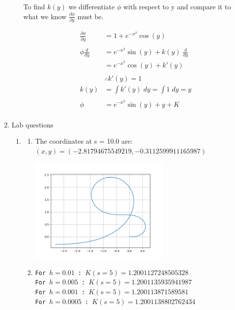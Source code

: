 \documentclass[a4paper,11pt]{article}
\begin{document}
\begin{preview}
\begin{enumerate}
\begin{enumerate}
    To find $k(y)$ we differentiate $\phi$ with respect to y and compare it to what we know $\frac{\partial \phi}{\partial y}$ must be.

    \begin{align*}
        \frac{\partial \phi}{\partial y} &= 1+e^{-x^2}\cos(y)\\\\
        \phi \frac{d}{dy} &= e^{-x^2}\sin(y) +k(y) \; \frac{d}{dy}\\
        &= e^{-x^2}\cos(y) +k'(y)\\\\
        &\therefore k'(y) = 1\\
        k(y) &= \int k'(y) \; dy = \int 1 \; dy = y\\\\
        \phi &= e^{-x^2}\sin(y) + y + K\\
    \end{align*}

\end{enumerate}

\item Lab questions

\begin{enumerate}
    \item
\begin{enumerate}
    \item The coordinates at s = 10.0 are: \\$(x,y) = (-2.81794675549219,-0.3112599911165987)$
    
    \begin{center}
        \includegraphics[width = 0.6\textwidth]{Figure_1.png}
    \end{center}

    \item 
    \texttt{For $h = 0.01$ : $K(s=5) = 1.2001127248505328$\\
            For $h = 0.005$ : $K(s=5) = 1.2001135935941987$\\
            For $h = 0.001$ : $K(s=5) = 1.200113871589581$\\
            For $h = 0.0005$ : $K(s=5) = 1.2001138802762434$\\}


\end{enumerate}
\end{enumerate}
\end{enumerate}
\end{preview}
\end{document}

